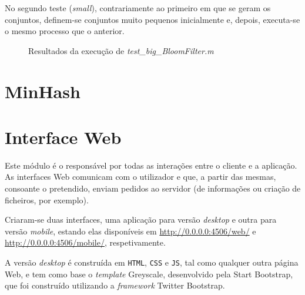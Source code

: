 \documentclass[a4paper,11pt,openright,oneside]{report}
\begin{document}
No segundo teste (\textit{small}), contrariamente ao primeiro em que se geram os conjuntos, definem-se conjuntos muito pequenos inicialmente e, depois, executa-se o mesmo processo que o anterior.

\begin{figure}[ht]	
\center
{}
\caption{Resultados da execução de \textit{test\_big\_BloomFilter.m}}
\label{fig:testbigbloom}
\end{figure}


\section{MinHash}
\label{sec.minhash}






\iffalse





\section{Interface Web}
\label{sec.web}

Este módulo é o responsável por todas as interações entre o cliente e a aplicação. As interfaces Web comunicam com o utilizador e que, a partir das mesmas, consoante o pretendido, enviam pedidos ao servidor (de informações ou criação de ficheiros, por exemplo).

Criaram-se duas interfaces, uma aplicação para versão \textit{desktop} e outra para versão \textit{mobile}, estando elas disponíveis em \url{http://0.0.0.0:4506/web/} e \url{http://0.0.0.0:4506/mobile/}, respetivamente.

A versão \textit{desktop} é construída em \verb|HTML|, \verb|CSS| e \verb|JS|, tal como qualquer outra página Web, e tem como base o \textit{template} Greyscale, desenvolvido pela Start Bootstrap, que foi construído utilizando a \textit{framework} Twitter Bootstrap.
\end{document}
